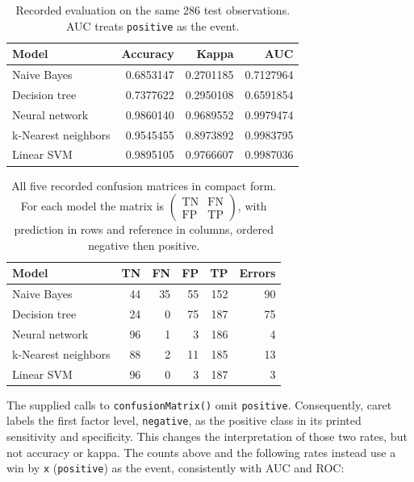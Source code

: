 \documentclass[11pt,a4paper]{article}
\begin{document}
\begin{table}[htbp]\centering
    \begin{tabular}{lrrr}\toprule
        Model               & Accuracy  & Kappa     & AUC       \\\midrule
        Naive Bayes         & 0.6853147 & 0.2701185 & 0.7127964 \\
        Decision tree       & 0.7377622 & 0.2950108 & 0.6591854 \\
        Neural network      & 0.9860140 & 0.9689552 & 0.9979474 \\
        k-Nearest neighbors & 0.9545455 & 0.8973892 & 0.9983795 \\
        Linear SVM          & 0.9895105 & 0.9766607 & 0.9987036 \\\bottomrule
    \end{tabular}
    \caption{Recorded evaluation on the same 286 test observations. AUC treats \texttt{positive} as the event.}
\end{table}
\begin{table}[htbp]\centering
    \begin{tabular}{lrrrrr}\toprule
        Model               & TN & FN & FP & TP  & Errors \\\midrule
        Naive Bayes         & 44 & 35 & 55 & 152 & 90     \\
        Decision tree       & 24 & 0  & 75 & 187 & 75     \\
        Neural network      & 96 & 1  & 3  & 186 & 4      \\
        k-Nearest neighbors & 88 & 2  & 11 & 185 & 13     \\
        Linear SVM          & 96 & 0  & 3  & 187 & 3      \\\bottomrule
    \end{tabular}
    \caption{All five recorded confusion matrices in compact form. For each model the matrix is
        $\left(\begin{smallmatrix}\mathrm{TN}&\mathrm{FN}\\\mathrm{FP}&\mathrm{TP}\end{smallmatrix}\right)$,
        with prediction in rows and reference in columns, ordered negative then positive.}
\end{table}
The supplied calls to \texttt{confusionMatrix()} omit \texttt{positive}. Consequently, caret labels the first factor level, \texttt{negative}, as the positive class in its printed sensitivity and specificity. This changes the interpretation of those two rates, but not accuracy or kappa. The counts above and the following rates instead use a win by \texttt{x} (\texttt{positive}) as the event, consistently with AUC and ROC:
\end{document}
